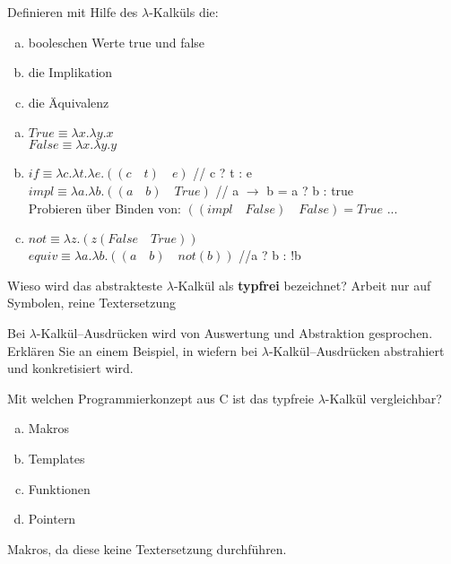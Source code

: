 \begin{card}
	Definieren mit Hilfe des $\lambda$-Kalküls die:
	\begin{enumerate}[a)]
	\item booleschen Werte true und false
	\item die Implikation
	\item die Äquivalenz 
	\end{enumerate}
	\hr
	\begin{enumerate}[a)]
	\item 	$True \equiv \lambda x.\lambda y . x$\\
			$False \equiv \lambda x.\lambda y . y$
	\item 	$if \equiv \lambda c.\lambda t.\lambda e.((c \quad t) \quad e)$ // c ? t : e\\
			$impl \equiv \lambda a.\lambda b.((a \quad b) \quad True)$ // a $\rightarrow$ b = a ? b : true\\
			Probieren über Binden von: $((impl \quad False) \quad False) = True$ ...
	\item	$not \equiv \lambda z.(z (False \quad True))$\\
			$equiv \equiv  \lambda a.\lambda b.((a \quad b) \quad not(b))$ //a ? b : !b
	\end{enumerate}
\end{card}

\begin{card}
	Wieso wird das abstrakteste $\lambda$-Kalkül als \textbf{typfrei} bezeichnet?
	\hr
	Arbeit nur auf Symbolen, reine Textersetzung
\end{card}

\begin{card}
	Bei $\lambda$-Kalkül–Ausdrücken wird von Auswertung und Abstraktion gesprochen. Erklären Sie an einem Beispiel, in wiefern bei $\lambda$-Kalkül–Ausdrücken abstrahiert und	konkretisiert wird.
	\hr
\end{card}

\begin{card}
	Mit welchen Programmierkonzept aus C ist das typfreie $\lambda$-Kalkül vergleichbar? 
	\begin{enumerate}[a)]
	\item Makros
	\item Templates
	\item Funktionen
	\item Pointern
	\end{enumerate}
	\hr
	Makros, da diese keine Textersetzung durchführen.
\end{card}

